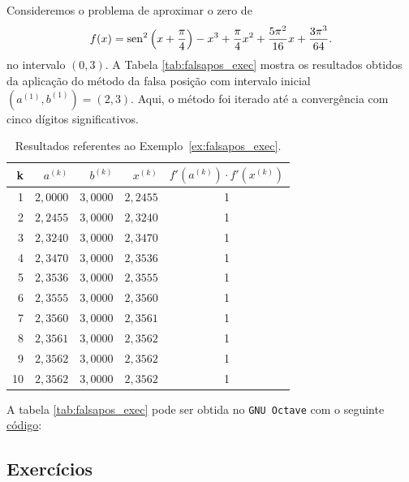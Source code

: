 \begin{ex}\label{ex:falsapos_exec}
  Consideremos o problema de aproximar o zero de
\begin{equation}
  f(x) = \operatorname{sen}^2\left(x+\frac{\pi}{4}\right) - x^3 + \frac{\pi}{4}x^2 + \frac{5\pi^2}{16}x + \frac{3\pi^3}{64}.
\end{equation}
no intervalo $(0, 3)$. A Tabela \ref{tab:falsapos_exec} mostra os resultados obtidos da aplicação do método da falsa posição com intervalo inicial $(a^{(1)}, b^{(1)}) = (2, 3)$. Aqui, o método foi iterado até a convergência com cinco dígitos significativos.

\begin{table}[h!]
  \centering
  \caption{Resultados referentes ao Exemplo~\ref{ex:falsapos_exec}.}
  \begin{tabular}{r|rr|r|c}
    k & $a^{(k)}$ & $b^{(k)}$ & $x^{(k)}$ & $f'(a^{(k)})\cdot f'(x^{(k)})$\\\hline
    1 & $2,0000$ & $3,0000$ & $2,2455$ & 1 \\
    2 & $2,2455$ & $3,0000$ & $2,3240$ &  1 \\
    3 & $2,3240$ & $3,0000$ & $2,3470$ & 1 \\
    4 & $2,3470$ & $3,0000$ & $2,3536$ & 1 \\
    5 & $2,3536$ & $3,0000$ & $2,3555$ & 1 \\
    6 & $2,3555$ & $3,0000$ & $2,3560$ & 1 \\
    7 & $2,3560$ & $3,0000$ & $2,3561$ &  1 \\
    8 & $2,3561$ & $3,0000$ & $2,3562$ & 1 \\
    9 & $2,3562$ & $3,0000$ & $2,3562$ & 1 \\
    10 & $2,3562$ & $3,0000$ & $2,3562$ & 1 \\\hline
  \end{tabular}
  \label{tab:bis_multpar}
\end{table}

\ifisoctave
A tabela \ref{tab:falsapos_exec} pode ser obtida no \verb+GNU Octave+ com o seguinte \href{https://github.com/phkonzen/notas/blob/master/src/MatematicaNumerica/cap_eq1d/dados/ex_falsapos_exec/ex_falsapos_exec.m}{código}:

\fi
\end{ex}

\subsection*{Exercícios}

